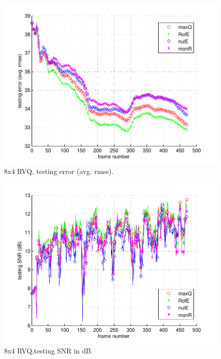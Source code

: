 								\begin{figure}[h!]
								\centering
								\includegraphics[height=0.4\textheight]{thesis/5_fish_8_4_1000_tst_armse.pdf}
								\caption{8x4 RVQ, testing error (avg. rmse).}
								\label{fig:5_fish_8_4_1000_tst_armse}
								\end{figure}

								\begin{figure}[h!]
								\centering
								\includegraphics[height=0.4\textheight]{thesis/5_fish_8_4_1000_tst_SNRdB.pdf}
								\caption{8x4 RVQ,testing SNR in dB.}
								\label{fig:5_fish_8_4_1000_tst_SNRdB}
								\end{figure}
